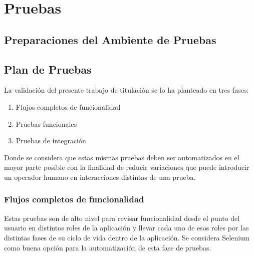 
\chapter{Pruebas}
\label{capitulo5}

\section{Preparaciones del Ambiente de Pruebas}

\section{Plan de Pruebas}
La validación del presente trabajo de titulación se lo ha planteado en tres fases:
\begin{enumerate}
  \item Flujos completos de funcionalidad
  \item Pruebas funcionales
  \item Pruebas de integración
\end{enumerate}
Donde se considera que estas mismas pruebas deben ser automatizados en el mayor parte posible con la finalidad de reducir variaciones que puede introducir un operador humano en interacciones distintas de una prueba.

\subsection{Flujos completos de funcionalidad}
Estas pruebas son de alto nivel para revisar funcionalidad desde el punto del usuario en distintos roles de la aplicación y llevar cada uno de esos roles por las distintas fases de su ciclo de vida dentro de la aplicación. Se considera Selenium como buena opción para la automatización de esta fase de pruebas.

